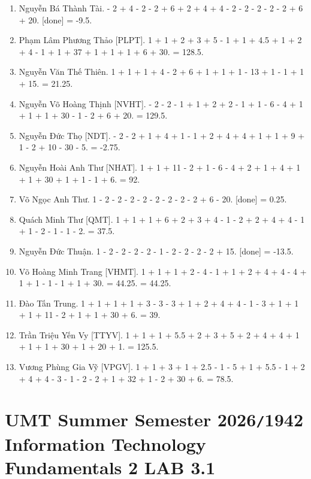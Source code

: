 \documentclass{article}
\begin{document}
\begin{enumerate}
	\item {\sc Nguyễn Bá Thành Tài.} - 2 + 4 - 2 - 2 + 6 + 2 + 4 + 4 - 2 - 2 - 2 - 2 - 2 + 6 + 20. [done] = -9.5.
	\item {\sc Phạm Lâm Phương Thảo [PLPT].} 1 + 1 + 2 + 3 + 5 - 1 + 1 + 4.5 + 1 + 2 + 4 - 1 + 1 + 37 + 1 + 1 + 1 + 6 + 30. = 128.5.
	\item {\sc Nguyễn Văn Thế Thiên.} 1 + 1 + 1 + 4 - 2 + 6 + 1 + 1 + 1 - 13 + 1 - 1 + 1 + 15. = 21.25.
	\item {\sc Nguyễn Võ Hoàng Thịnh [NVHT].} - 2 - 2 - 1 + 1 + 2 + 2 - 1 + 1 - 6 - 4 + 1 + 1 + 1 + 30 - 1 - 2 + 6 + 20. = 129.5.
	\item {\sc Nguyễn Đức Thọ [NDT].} - 2 - 2 + 1 + 4 + 1 - 1 + 2 + 4 + 4 + 1 + 1 + 9 + 1 - 2 + 10 - 30 - 5. = -2.75.
	\item {\sc Nguyễn Hoài Anh Thư [NHAT].} 1 + 1 + 11 - 2 + 1 - 6 - 4 + 2 + 1 + 4 + 1 + 1 + 30 + 1 + 1 - 1 + 6. = 92.
	\item {\sc Võ Ngọc Anh Thư.} 1 - 2 - 2 - 2 - 2 - 2 - 2 - 2 - 2 + 6 - 20. [done] = 0.25.
	\item {\sc Quách Minh Thư [QMT].} 1 + 1 + 1 + 6 + 2 + 3 + 4 - 1 - 2 + 2 + 4 + 4 - 1 + 1 - 2 - 1 - 1 - 2. = 37.5.
	\item {\sc Nguyễn Đức Thuận.} 1 - 2 - 2 - 2 - 2 - 1 - 2 - 2 - 2 - 2 + 15. [done] = -13.5.
	\item {\sc Võ Hoàng Minh Trang [VHMT].} 1 + 1 + 1 + 2 - 4 - 1 + 1 + 2 + 4 + 4 - 4 + 1 + 1 - 1 - 1 + 1 + 30. = 44.25. = 44.25.
	\item {\sc Đào Tấn Trung.} 1 + 1 + 1 + 1 + 3 - 3 - 3 + 1 + 2 + 4 + 4 - 1 - 3 + 1 + 1 + 1 + 11 - 2 + 1 + 1 + 30 + 6. = 39.
	\item {\sc Trần Triệu Yến Vy [TTYV].} 1 + 1 + 1 + 5.5 + 2 + 3 + 5 + 2 + 4 + 4 + 1 + 1 + 1 + 30 + 1 + 20 + 1. = 125.5.
	\item {\sc Vương Phùng Gia Vỹ [VPGV].} 1 + 1 + 3 + 1 + 2.5 - 1 - 5 + 1 + 5.5 - 1 + 2 + 4 + 4 - 3 - 1 - 2 - 2 + 1 + 32 + 1 - 2 + 30 + 6. = 78.5.
\end{enumerate}


\section{UMT Summer Semester 2026{\tt/}1942 Information Technology Fundamentals 2 LAB 3.1}
\end{document}
